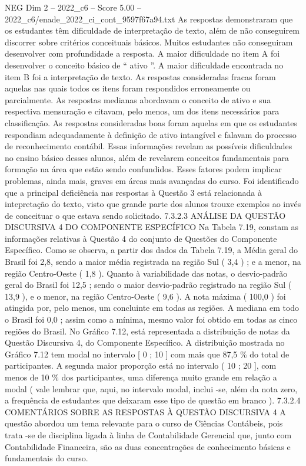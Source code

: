 \begin{textsample}{NEG Dim 2 – 2022\_c6 – Score 5.00 – 2022\_c6/enade\_2022\_ci\_cont\_9597f67a94.txt}
As respostas demonstraram que os estudantes têm dificuldade de interpretação de texto, além de não conseguirem discorrer sobre critérios conceituais básicos.
Muitos estudantes não conseguiram desenvolver com profundidade a resposta.
A maior dificuldade no item A foi desenvolver o conceito básico de “ ativo ”.
A maior dificuldade encontrada no item B foi a interpretação de texto.
As respostas consideradas fracas foram aquelas nas quais todos os itens foram respondidos erroneamente ou parcialmente.
As respostas medianas abordavam o conceito de ativo e sua respectiva mensuração e citavam, pelo menos, um dos itens necessários para classificação.
As respostas consideradas boas foram aquelas em que os estudantes respondiam adequadamente à definição de ativo intangível e falavam do processo de reconhecimento contábil.
Essas informações revelam as possíveis dificuldades no ensino básico desses alunos, além de revelarem conceitos fundamentais para formação na área que estão sendo confundidos.
Esses fatores podem implicar problemas, ainda mais, graves em áreas mais avançadas do curso.
Foi identificado que a principal deficiência nas respostas à Questão 3 está relacionada à intepretação do texto, visto que grande parte dos alunos trouxe exemplos ao invés de conceituar o que estava sendo solicitado. 7.3.2.3 ANÁLISE DA QUESTÃO DISCURSIVA 4 DO COMPONENTE ESPECÍFICO Na Tabela 7.19, constam as informações relativas à Questão 4 do conjunto de Questões do Componente Específico.
Como se observa, a partir dos dados da Tabela 7.19, a Média geral do Brasil foi 2,8, sendo a maior média registrada na região Sul ( 3,4 ) ; e a menor, na região Centro-Oeste ( 1,8 ).
Quanto à variabilidade das notas, o desvio-padrão geral do Brasil foi 12,5 ; sendo o maior desvio-padrão registrado na região Sul ( 13,9 ), e o menor, na região Centro-Oeste ( 9,6 ).
A nota máxima ( 100,0 ) foi atingida por, pelo menos, um concluinte em todas as regiões.
A mediana em todo o Brasil foi 0,0 ; assim como a mínima, mesmo valor foi obtido em todas as cinco regiões do Brasil.
No Gráfico 7.12, está representada a distribuição de notas da Questão Discursiva 4, do Componente Específico.
A distribuição mostrada no Gráfico 7.12 tem modal no intervalo [ 0 ; 10 ] com mais que 87,5 \% do total de participantes.
A segunda maior proporção está no intervalo ( 10 ; 20 ], com menos de 10 \% dos participantes, uma diferença muito grande em relação a modal ( vale lembrar que, aqui, no intervalo modal, inclui -se, além da nota zero, a frequência de estudantes que deixaram esse tipo de questão em branco ). 7.3.2.4 COMENTÁRIOS SOBRE AS RESPOSTAS À QUESTÃO DISCURSIVA 4 A questão abordou um tema relevante para o curso de Ciências Contábeis, pois trata -se de disciplina ligada à linha de Contabilidade Gerencial que, junto com Contabilidade Financeira, são as duas concentrações de conhecimento básicas e fundamentais do curso.

\end{textsample}
